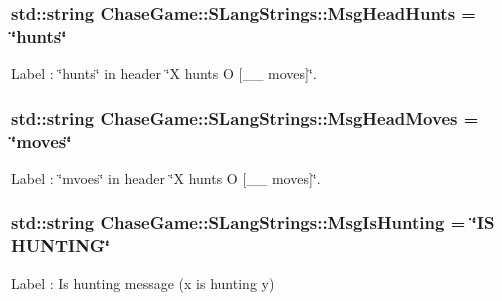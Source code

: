 \hypertarget{struct_chase_game_1_1_s_lang_strings_ae50e2fb23b58db21d1e9eeae0724a480}{
\subsubsection[{Msg\-Head\-Hunts}]{\setlength{\rightskip}{0pt plus 5cm}std\-::string Chase\-Game\-::\-S\-Lang\-Strings\-::\-Msg\-Head\-Hunts = \char`\"{}hunts\char`\"{}}}\label{struct_chase_game_1_1_s_lang_strings_ae50e2fb23b58db21d1e9eeae0724a480}


Label \-: \char`\"{}hunts\char`\"{} in header \char`\"{}\-X hunts O \mbox{[}\-\_\-\-\_\- moves\mbox{]}\char`\"{}. 

\hypertarget{struct_chase_game_1_1_s_lang_strings_a06fad00de9d27f4b289c01728ab55be1}{
\subsubsection[{Msg\-Head\-Moves}]{\setlength{\rightskip}{0pt plus 5cm}std\-::string Chase\-Game\-::\-S\-Lang\-Strings\-::\-Msg\-Head\-Moves = \char`\"{}moves\char`\"{}}}\label{struct_chase_game_1_1_s_lang_strings_a06fad00de9d27f4b289c01728ab55be1}


Label \-: \char`\"{}mvoes\char`\"{} in header \char`\"{}\-X hunts O \mbox{[}\-\_\-\-\_\- moves\mbox{]}\char`\"{}. 

\hypertarget{struct_chase_game_1_1_s_lang_strings_ae186b81b6002ed3e2d795e5adecca95e}{
\subsubsection[{Msg\-Is\-Hunting}]{\setlength{\rightskip}{0pt plus 5cm}std\-::string Chase\-Game\-::\-S\-Lang\-Strings\-::\-Msg\-Is\-Hunting = \char`\"{}I\-S H\-U\-N\-T\-I\-N\-G\char`\"{}}}\label{struct_chase_game_1_1_s_lang_strings_ae186b81b6002ed3e2d795e5adecca95e}


Label \-: Is hunting message (x is hunting y) 

